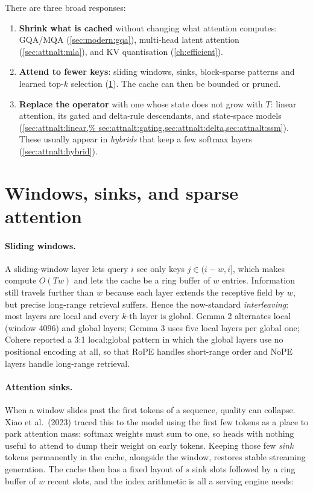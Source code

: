 There are three broad responses:
\begin{enumerate}
\item \textbf{Shrink what is cached} without changing what attention computes: GQA/MQA
  (\cref{sec:modern:gqa}), multi-head latent attention (\cref{sec:attnalt:mla}), and KV quantisation
  (\cref{ch:efficient}).
\item \textbf{Attend to fewer keys}: sliding windows, sinks, block-sparse patterns and learned top-$k$
  selection (\cref{sec:attnalt:sparse}). The cache can then be bounded or pruned.
\item \textbf{Replace the operator} with one whose state does not grow with $T$: linear attention, its
  gated and delta-rule descendants, and state-space models (\cref{sec:attnalt:linear,%
  sec:attnalt:gating,sec:attnalt:delta,sec:attnalt:ssm}). These usually appear in \emph{hybrids} that keep
  a few softmax layers (\cref{sec:attnalt:hybrid}).
\end{enumerate}

\section{Windows, sinks, and sparse attention}\label{sec:attnalt:sparse}

\paragraph{Sliding windows.} A sliding-window layer lets query $i$ see only keys $j\in(i-w,i]$, which makes
compute $O(Tw)$ and lets the cache be a ring buffer of $w$ entries. Information still travels further than
$w$ because each layer extends the receptive field by $w$, but precise long-range retrieval suffers. Hence
the now-standard \emph{interleaving}: most layers are local and every $k$-th layer is global. Gemma 2
alternates local (window 4096) and global layers; Gemma 3 uses five local layers per global one; Cohere
reported a 3:1 local:global pattern in which the global layers use no positional encoding at all, so that
RoPE handles short-range order and NoPE layers handle long-range retrieval.

\paragraph{Attention sinks.} When a window slides past the first tokens of a sequence, quality can collapse.
Xiao et al.~(2023) traced this to the model using the first few tokens as a place to park attention mass:
softmax weights must sum to one, so heads with nothing useful to attend to dump their weight on early
tokens. Keeping those few \emph{sink} tokens permanently in the cache, alongside the window, restores
stable streaming generation.
The cache then has a fixed layout of $s$ sink slots followed by a ring buffer of $w$ recent slots, and the
index arithmetic is all a serving engine needs:

